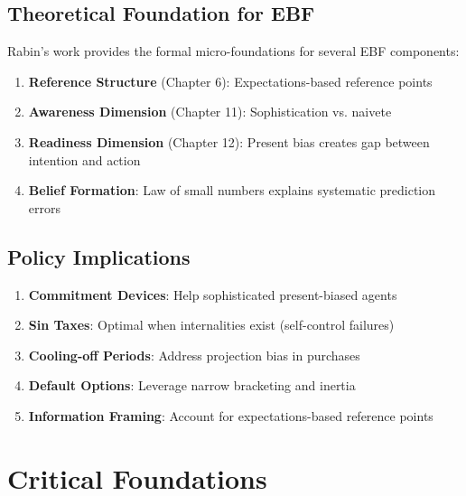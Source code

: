\subsection{Theoretical Foundation for EBF}

Rabin's work provides the formal micro-foundations for several EBF components:

\begin{enumerate}
    \item \textbf{Reference Structure} (Chapter 6): Expectations-based reference points
    \item \textbf{Awareness Dimension} (Chapter 11): Sophistication vs. naivete
    \item \textbf{Readiness Dimension} (Chapter 12): Present bias creates gap between intention and action
    \item \textbf{Belief Formation}: Law of small numbers explains systematic prediction errors
\end{enumerate}

\subsection{Policy Implications}

\begin{tcolorbox}[colback=yellow!5!white,colframe=yellow!75!black,title=Policy Implications from Rabin]
\begin{enumerate}
    \item \textbf{Commitment Devices}: Help sophisticated present-biased agents
    \item \textbf{Sin Taxes}: Optimal when internalities exist (self-control failures)
    \item \textbf{Cooling-off Periods}: Address projection bias in purchases
    \item \textbf{Default Options}: Leverage narrow bracketing and inertia
    \item \textbf{Information Framing}: Account for expectations-based reference points
\end{enumerate}
\end{tcolorbox}

\section{Critical Foundations}

